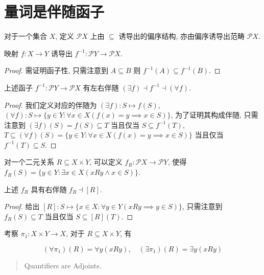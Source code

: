 \section{量词是伴随函子}

\begin{definition}
    对于一个集合 \(X\), 定义 \(\mathcal{P} X\) 上由 \(\subseteq\) 诱导出的偏序结构,
    亦由偏序诱导出范畴 \(\mathcal{P} X\).
\end{definition}

\begin{lemma}
    映射 \(f : X \to Y\) 诱导出 \(f^{-1} : \mathcal{P} Y \to \mathcal{P} X\).

    \begin{proof}
        需证明函子性, 只需注意到 \(A \subseteq B\) 则 \(f^{-1}(A) \subseteq f^{-1}(B)\).
    \end{proof}
\end{lemma}

\begin{lemma}
    上述函子 \(f^{-1} : \mathcal{P} Y \to \mathcal{P} X\) 有左右伴随 \((\exists f) \dashv f^{-1} \dashv (\forall f)\).

    \begin{proof}
        我们定义对应的伴随为 \((\exists f) : S \mapsto f(S)\), \((\forall f) : S \mapsto \{y \in Y : \forall x \in X (f(x) = y \implies x \in S)\}\), 为了证明其构成伴随,
        只需注意到 \((\exists f)(S) = f(S) \subseteq T\) 当且仅当 \(S \subseteq f^{-1} (T)\), 
        \(T \subseteq (\forall f)(S) = \{y \in Y : \forall x \in X (f(x) = y \implies x \in S)\}\) 当且仅当 \(f^{-1} (T) \subseteq S\).
    \end{proof}
\end{lemma}

\begin{definition}
    对一个二元关系 \(R \subseteq X \times Y\), 可以定义 \(f_R : \mathcal{P} X \to \mathcal{P} Y\), 使得 \(f_R (S) = \{y \in Y : \exists x \in X (x R y \land x \in S)\}\).
\end{definition}

\begin{lemma}
    上述 \(f_R\) 具有右伴随 \(f_R \dashv [R]\).

    \begin{proof}
        给出 \([R] : S \mapsto \{x \in X : \forall y \in Y (x R y \implies y \in S)\}\), 只需注意到 \(f_R (S) \subseteq T\) 当且仅当 \(S \subseteq [R] (T)\).
    \end{proof}
\end{lemma}

\begin{definition}
    考察 \(\pi_1 : X \times Y \to X\), 对于 \(R \subseteq X \times Y\), 有

    \[
        (\forall \pi_1) (R) = \forall y (x R y), \quad (\exists \pi_1) (R) = \exists y (x R y)
    \]
\end{definition}

    \begin{quotation}
        Quantifiers are Adjoints.
    \end{quotation}
